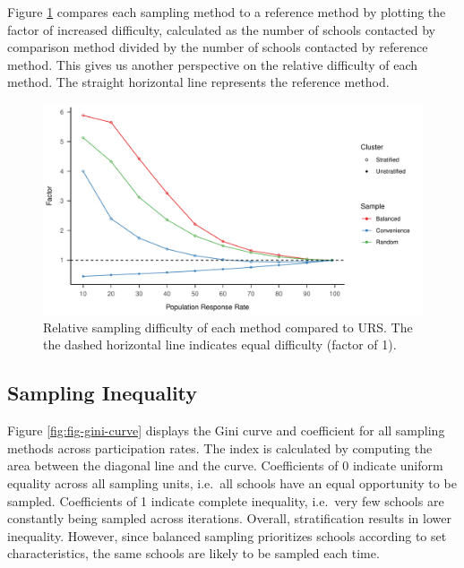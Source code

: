 \documentclass[
  english,
  man,floatsintext]{apa6}
\begin{document}
Figure \ref{fig:fig-rel-per} compares each sampling method to a reference method by plotting the factor of increased difficulty, calculated as the number of schools contacted by comparison method divided by the number of schools contacted by reference method. This gives us another perspective on the relative difficulty of each method. The straight horizontal line represents the reference method.



\begin{figure}
\centering
\includegraphics{6---Paper_files/figure-latex/fig-rel-per-1.pdf}
\caption{\label{fig:fig-rel-per}Relative sampling difficulty of each method compared to URS. The the dashed horizontal line indicates equal difficulty (factor of 1).}
\end{figure}

\newpage

\hypertarget{sampling-inequality}{%
\subsection{Sampling Inequality}\label{sampling-inequality}}

Figure \ref{fig:fig-gini-curve} displays the Gini curve and coefficient for all sampling methods across participation rates. The index is calculated by computing the area between the diagonal line and the curve. Coefficients of 0 indicate uniform equality across all sampling units, i.e.~all schools have an equal opportunity to be sampled. Coefficients of 1 indicate complete inequality, i.e.~very few schools are constantly being sampled across iterations. Overall, stratification results in lower inequality. However, since balanced sampling prioritizes schools according to set characteristics, the same schools are likely to be sampled each time.
\end{document}

